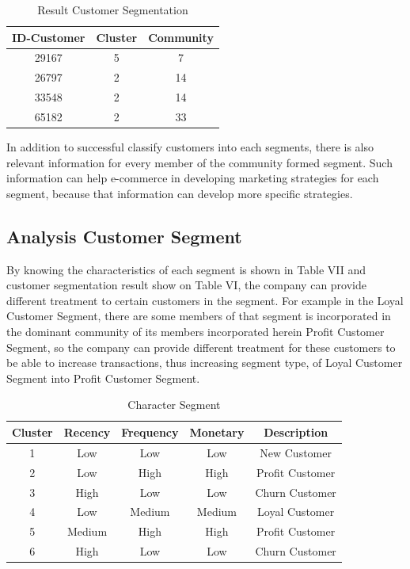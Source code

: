 \documentclass[conference]{IEEEtran}
\begin{document}
\begin{table}[h]
\renewcommand{\arraystretch}{1.3}
\caption{Result Customer Segmentation}
\label{tab:result_all}
\centering
\begin{tabular}{c|c|c}
    \hline
    ID-Customer & Cluster & Community\\
    \hline
    29167 & 5 & 7\\
    \hline
    26797 & 2 & 14\\
    \hline
    33548 & 2 & 14\\
    \hline
    65182 & 2 & 33\\
    \hline
\end{tabular}
\end{table}

In addition to successful classify customers into each segments, there is also relevant information for every member of the community formed segment. Such information can help e-commerce in developing marketing strategies for each segment, because that information can develop more specific strategies.



\subsection{Analysis Customer Segment}
By knowing the characteristics of each segment is shown in Table VII and customer segmentation result show on Table VI, the company can provide different treatment to certain customers in the segment. For example in the Loyal Customer Segment, there are some members of that segment is incorporated in the dominant community of its members incorporated herein Profit Customer Segment, so the company can provide different treatment for these customers to be able to increase transactions, thus increasing segment type, of Loyal Customer Segment into Profit Customer Segment.

\begin{table}[h]
\renewcommand{\arraystretch}{1.3}
\caption{Character Segment}
\label{tab:Character_segment}
\centering
\begin{tabular}{c|c|c|c|c}
    \hline
    Cluster & Recency & Frequency & Monetary & Description\\
    \hline
    1 & Low & Low & Low & New Customer\\
    \hline
    2 & Low & High & High & Profit Customer\\
    \hline
    3 & High & Low & Low & Churn Customer\\
    \hline
    4 & Low & Medium & Medium & Loyal Customer\\
    \hline
    5 & Medium & High & High & Profit Customer\\
    \hline
    6 & High & Low & Low & Churn Customer\\
    \hline
\end{tabular}
\end{table}
\end{document}

